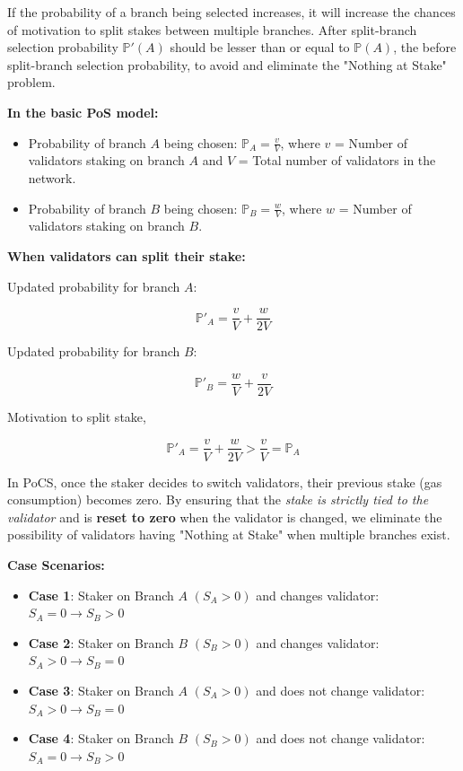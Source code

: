 \documentclass{article}
\begin{document}
If the probability of a branch being selected increases, it will increase the chances of motivation to split stakes between multiple branches. After split-branch selection probability $\mathbb{P}'(A)$ should be lesser than or equal to $\mathbb{P}(A)$, the before split-branch selection probability, to avoid and eliminate the "Nothing at Stake" problem.

\textbf{In the basic PoS model:}

\begin{itemize}
    \item Probability of branch $A$ being chosen: $\mathbb{P}_A = \frac{v}{V}$, where $v$ = Number of validators staking on branch $A$ and $V$ = Total number of validators in the network.
    \item Probability of branch $B$ being chosen: $\mathbb{P}_B = \frac{w}{V}$, where $w$ = Number of validators staking on branch $B$.
\end{itemize}

\textbf{When validators can split their stake:}

Updated probability for branch $A$:

$$\mathbb{P}'_A = \frac{v}{V} + \frac{w}{2V}$$

Updated probability for branch $B$:

$$\mathbb{P}'_B = \frac{w}{V} + \frac{v}{2V}$$

Motivation to split stake,

$$\mathbb{P}'_A = \frac{v}{V} + \frac{w}{2V} > \frac{v}{V} = \mathbb{P}_A$$

In PoCS, once the staker decides to switch validators, their previous stake (gas consumption) becomes zero. By ensuring that the \textit{stake is strictly tied to the validator} and is \textbf{reset to zero} when the validator is changed, we eliminate the possibility of validators having "Nothing at Stake" when multiple branches exist.

\textbf{Case Scenarios:}

\begin{itemize}
    \item \textbf{Case 1}: Staker on Branch $A$ $(S_A > 0)$ and changes validator: $S_A=0 \rightarrow S_B>0$
    \item \textbf{Case 2}: Staker on Branch $B$ $(S_B > 0)$ and changes validator: $S_A>0 \rightarrow S_B=0$
    \item \textbf{Case 3}: Staker on Branch $A$ $(S_A > 0)$ and does not change validator: $S_A>0 \rightarrow S_B=0$
    \item \textbf{Case 4}: Staker on Branch $B$ $(S_B > 0)$ and does not change validator: $S_A=0 \rightarrow S_B>0$
\end{itemize}
\end{document}
